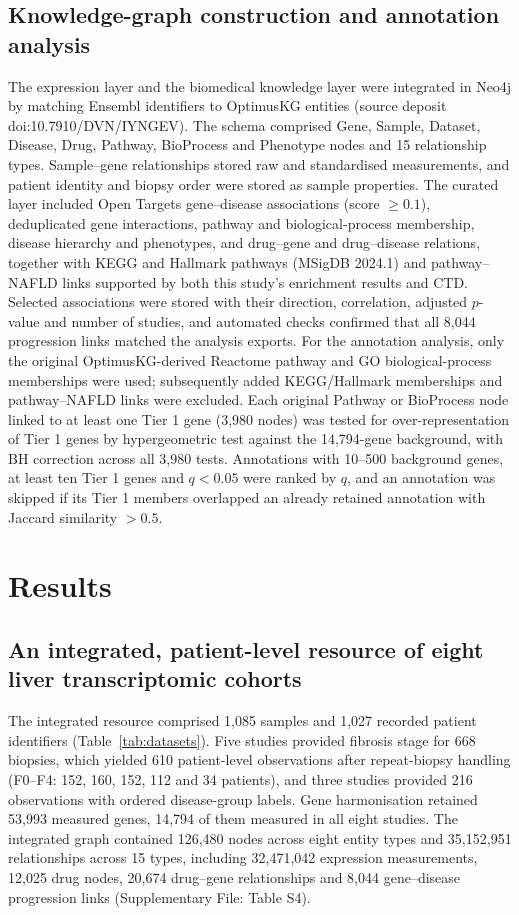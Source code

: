 \documentclass[11pt,a4paper]{article}
\begin{document}
\subsection*{Knowledge-graph construction and annotation analysis}
The expression layer and the biomedical knowledge layer were integrated in Neo4j by matching Ensembl identifiers to OptimusKG entities \cite{optimuskg} (source deposit doi:10.7910/DVN/IYNGEV). The schema comprised Gene, Sample, Dataset, Disease, Drug, Pathway, BioProcess and Phenotype nodes and 15 relationship types. Sample--gene relationships stored raw and standardised measurements, and patient identity and biopsy order were stored as sample properties. The curated layer included Open Targets \cite{ochoa2023} gene--disease associations (score $\geq0.1$), deduplicated gene interactions, pathway and biological-process membership, disease hierarchy and phenotypes, and drug--gene and drug--disease relations, together with KEGG and Hallmark pathways (MSigDB 2024.1) and pathway--NAFLD links supported by both this study's enrichment results and CTD. Selected associations were stored with their direction, correlation, adjusted $p$-value and number of studies, and automated checks confirmed that all 8,044 progression links matched the analysis exports. For the annotation analysis, only the original OptimusKG-derived Reactome pathway and GO biological-process memberships were used; subsequently added KEGG/Hallmark memberships and pathway--NAFLD links were excluded. Each original Pathway or BioProcess node linked to at least one Tier 1 gene (3,980 nodes) was tested for over-representation of Tier 1 genes by hypergeometric test against the 14,794-gene background, with BH correction across all 3,980 tests. Annotations with 10--500 background genes, at least ten Tier 1 genes and $q<0.05$ were ranked by $q$, and an annotation was skipped if its Tier 1 members overlapped an already retained annotation with Jaccard similarity $>0.5$.



\section*{Results}
\subsection*{An integrated, patient-level resource of eight liver transcriptomic cohorts}
The integrated resource comprised 1,085 samples and 1,027 recorded patient identifiers (Table~\ref{tab:datasets}). Five studies provided fibrosis stage for 668 biopsies, which yielded 610 patient-level observations after repeat-biopsy handling (F0--F4: 152, 160, 152, 112 and 34 patients), and three studies provided 216 observations with ordered disease-group labels. Gene harmonisation retained 53,993 measured genes, 14,794 of them measured in all eight studies. The integrated graph contained 126,480 nodes across eight entity types and 35,152,951 relationships across 15 types, including 32,471,042 expression measurements, 12,025 drug nodes, 20,674 drug--gene relationships and 8,044 gene--disease progression links (Supplementary File: Table S4).
\end{document}
